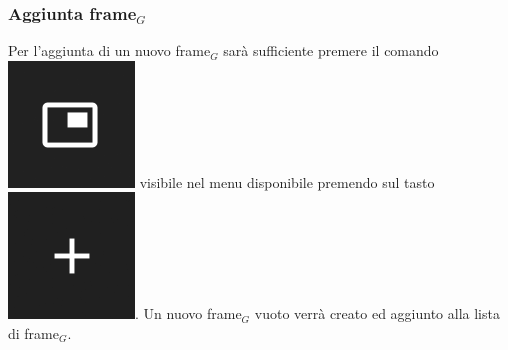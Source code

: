 \subsubsection{Aggiunta frame$_G$}
Per l'aggiunta di un nuovo frame$_G$ sarà sufficiente premere il comando \includegraphics[scale=0.4]{img/add_frame.png} visibile nel menu disponibile premendo sul tasto \includegraphics[scale=0.4]{img/add_object.png}. Un nuovo frame$_G$ vuoto verrà creato ed aggiunto alla lista di frame$_G$.


